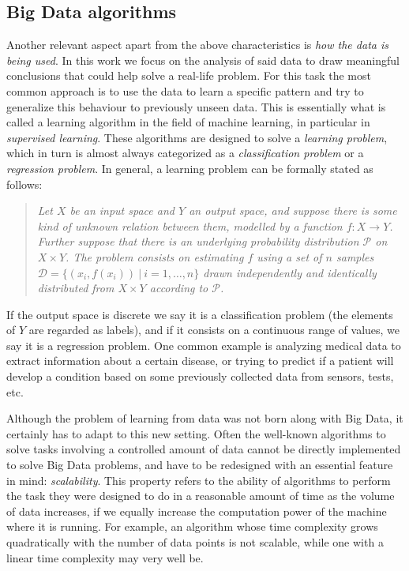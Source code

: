\subsection{Big Data algorithms}

Another relevant aspect apart from the above characteristics is \textit{how the data is being used}. In this work we focus on the analysis of said data to draw meaningful conclusions that could help solve a real-life problem. For this task the most common approach is to use the data to learn a specific pattern and try to generalize this behaviour to previously unseen data. This is essentially what is called a learning algorithm in the field of machine learning, in particular in \textit{supervised learning}. These algorithms are designed to solve a \textit{learning problem}, which in turn is almost always categorized as a \textit{classification problem} or a \textit{regression problem}.
In general, a learning problem can be formally stated as follows:

\begin{quotation}
  \itshape \noindent
  Let $X$ be an input space and $Y$ an output space, and suppose there is some kind of unknown relation between them, modelled by a function $f:X\to Y$. Further suppose that there is an underlying probability distribution $\mathcal P$ on $X \times Y$. The problem consists on estimating $f$ using a set of $n$ samples $\mathcal D = \{ (x_i, f(x_i)) \ | \ i = 1,\dots,n \}$ drawn independently and identically distributed from $X \times Y$ according to $\mathcal P$.
\end{quotation}
If the output space is discrete we say it is a classification problem (the elements of $Y$ are regarded as labels), and if it consists on a continuous range of values, we say it is a regression problem. One common example is analyzing medical data to extract information about a certain disease, or trying to predict if a patient will develop a condition based on some previously collected data from sensors, tests, etc.

Although the problem of learning from data was not born along with Big Data, it certainly has to adapt to this new setting. Often the well-known algorithms to solve tasks involving a controlled amount of data cannot be directly implemented to solve Big Data problems, and have to be redesigned with an essential feature in mind: \textit{scalability}. This property refers to the ability of algorithms to perform the task they were designed to do in a reasonable amount of time as the volume of data increases, if we equally increase the computation power of the machine where it is running. For example, an algorithm whose time complexity grows quadratically with the number of data points is not scalable, while one with a linear time complexity may very well be.

